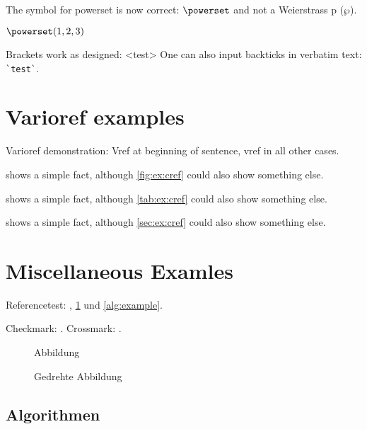 \documentclass[
  numbers=autoendperiod,
  ngerman,  %
  a4paper,  %
  twoside,  %
  bibliography=totoc,
  headsepline,
  cleardoublepage=empty,
  parskip=half,
  draft=false
]{scrbook}
\theoremstyle{break}
\newcommand{\dingcheck}{\ding{51}}
\newcommand{\dingcross}{\ding{55}}
\begin{document}
\begin{ltgexample}
The symbol for powerset is now correct: $\powerset$ and not a Weierstrass p ($\wp$).

$\powerset({1,2,3})$
\end{ltgexample}

\begin{ltgexample}
Brackets work as designed:
<test>
One can also input backticks in verbatim text: \verb|`test`|.
\end{ltgexample}


\section{Varioref examples}
\label{sec:ex:vref}

Varioref demonstration: Vref at beginning of sentence, vref in all other cases.

\begin{ltgexample}
 shows a simple fact, although \vref{fig:ex:cref} could also show something else.

 shows a simple fact, although \vref{tab:ex:cref} could also show something else.

 shows a simple fact, although \vref{sec:ex:cref} could also show something else.
\end{ltgexample}
\section{Miscellaneous Examles}
\label{ssec:example}

Referencetest: , \cref{fig:Abbildung} und \cref{alg:example}.

\begin{ltgexample}
Checkmark: \dingcheck.
Crossmark: \dingcross.
\end{ltgexample}

\begin{figure}
  \missingfigure{}
  \caption{Abbildung}
  \label{fig:Abbildung}
\end{figure}

\begin{landscape}
  \begin{figure}
    \missingfigure{}
    \caption{Gedrehte Abbildung}
    \label{fig:AbbildungGedreht}
  \end{figure}
\end{landscape}

\subsection{Algorithmen}
\end{document}
